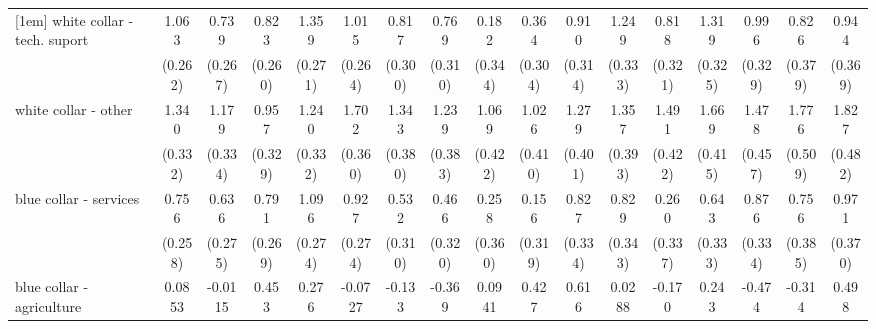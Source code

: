 {\begin{tabular}{l*{16}{c}}
[1em]
white collar - tech. suport&       1.063\sym{***}&       0.739\sym{**} &       0.823\sym{**} &       1.359\sym{***}&       1.015\sym{***}&       0.817\sym{**} &       0.769\sym{*}  &       0.182         &       0.364         &       0.910\sym{**} &       1.249\sym{***}&       0.818\sym{*}  &       1.319\sym{***}&       0.996\sym{**} &       0.826\sym{*}  &       0.944\sym{*}  \\
                    &     (0.262)         &     (0.267)         &     (0.260)         &     (0.271)         &     (0.264)         &     (0.300)         &     (0.310)         &     (0.344)         &     (0.304)         &     (0.314)         &     (0.333)         &     (0.321)         &     (0.325)         &     (0.329)         &     (0.379)         &     (0.369)         \\
[1em]
white collar - other&       1.340\sym{***}&       1.179\sym{***}&       0.957\sym{**} &       1.240\sym{***}&       1.702\sym{***}&       1.343\sym{***}&       1.239\sym{**} &       1.069\sym{*}  &       1.026\sym{*}  &       1.279\sym{**} &       1.357\sym{***}&       1.491\sym{***}&       1.669\sym{***}&       1.478\sym{**} &       1.776\sym{***}&       1.827\sym{***}\\
                    &     (0.332)         &     (0.334)         &     (0.329)         &     (0.332)         &     (0.360)         &     (0.380)         &     (0.383)         &     (0.422)         &     (0.410)         &     (0.401)         &     (0.393)         &     (0.422)         &     (0.415)         &     (0.457)         &     (0.509)         &     (0.482)         \\
[1em]
blue collar - services&       0.756\sym{**} &       0.636\sym{*}  &       0.791\sym{**} &       1.096\sym{***}&       0.927\sym{***}&       0.532         &       0.466         &       0.258         &       0.156         &       0.827\sym{*}  &       0.829\sym{*}  &       0.260         &       0.643         &       0.876\sym{**} &       0.756\sym{*}  &       0.971\sym{**} \\
                    &     (0.258)         &     (0.275)         &     (0.269)         &     (0.274)         &     (0.274)         &     (0.310)         &     (0.320)         &     (0.360)         &     (0.319)         &     (0.334)         &     (0.343)         &     (0.337)         &     (0.333)         &     (0.334)         &     (0.385)         &     (0.370)         \\
[1em]
blue collar - agriculture&      0.0853         &     -0.0115         &       0.453         &       0.276         &     -0.0727         &      -0.133         &      -0.369         &      0.0941         &       0.427         &       0.616         &      0.0288         &      -0.170         &       0.243         &      -0.474         &      -0.314         &       0.498         \\

\end{tabular}}
